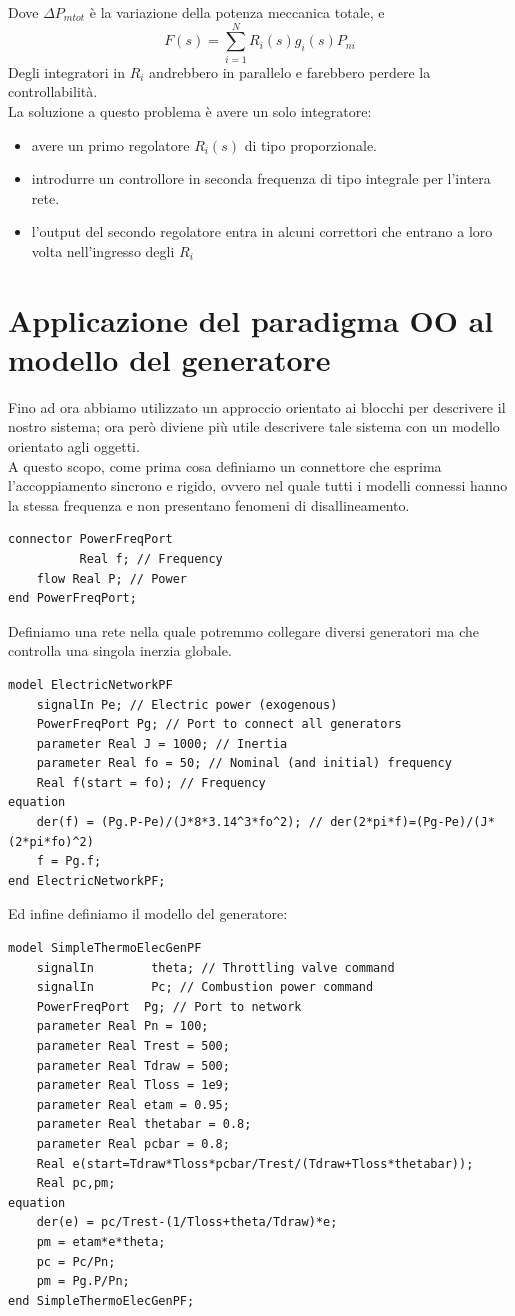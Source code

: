 Dove $\Delta P_{mtot}$ è la variazione della potenza meccanica totale, e
$$F(s)=\sum_{i=1}^N R_i(s)g_i(s)P_{ni}$$
Degli integratori in $R_i$ andrebbero in parallelo e farebbero perdere la controllabilità.\\
La soluzione a questo problema è avere un solo integratore:
\begin{itemize}
\item avere un primo regolatore $R_i(s)$ di tipo proporzionale.
\item introdurre un controllore in seconda frequenza di tipo integrale per l'intera rete.
\item l'output del secondo regolatore entra in alcuni correttori che entrano a loro volta nell'ingresso degli $R_i$
\end{itemize}
\section{Applicazione del paradigma OO al modello del generatore}
Fino ad ora abbiamo utilizzato un approccio orientato ai blocchi per descrivere il nostro sistema; ora però diviene più utile descrivere tale sistema con un modello orientato agli oggetti.\\
A questo scopo, come prima cosa definiamo un connettore che esprima l'accoppiamento sincrono e rigido, ovvero nel quale tutti i modelli connessi hanno la stessa frequenza e non presentano fenomeni di disallineamento.
\begin{verbatim}
connector PowerFreqPort
		  Real f; // Frequency
	flow Real P; // Power
end PowerFreqPort;
\end{verbatim}
Definiamo una rete nella quale potremmo collegare diversi generatori ma che controlla una singola inerzia globale.
\begin{verbatim}
model ElectricNetworkPF
	signalIn Pe; // Electric power (exogenous)
	PowerFreqPort Pg; // Port to connect all generators
	parameter Real J = 1000; // Inertia
	parameter Real fo = 50; // Nominal (and initial) frequency
	Real f(start = fo); // Frequency
equation
	der(f) = (Pg.P-Pe)/(J*8*3.14^3*fo^2); // der(2*pi*f)=(Pg-Pe)/(J*(2*pi*fo)^2)
	f = Pg.f;
end ElectricNetworkPF;
\end{verbatim}
Ed infine definiamo il modello del generatore:
\begin{verbatim}
model SimpleThermoElecGenPF
	signalIn 		theta; // Throttling valve command
	signalIn 		Pc; // Combustion power command
	PowerFreqPort  Pg; // Port to network
	parameter Real Pn = 100;
	parameter Real Trest = 500;
	parameter Real Tdraw = 500;
	parameter Real Tloss = 1e9;
	parameter Real etam = 0.95;
	parameter Real thetabar = 0.8;
	parameter Real pcbar = 0.8;
	Real e(start=Tdraw*Tloss*pcbar/Trest/(Tdraw+Tloss*thetabar));
	Real pc,pm;
equation
	der(e) = pc/Trest-(1/Tloss+theta/Tdraw)*e;
	pm = etam*e*theta;
	pc = Pc/Pn;
	pm = Pg.P/Pn;
end SimpleThermoElecGenPF;
\end{verbatim}
